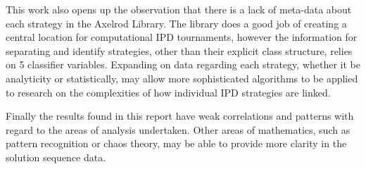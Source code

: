 This work also opens up the observation that there is a lack of meta-data about each strategy in the Axelrod Library.
The library does a good job of creating a central location for computational IPD tournaments, however the information for separating and identify strategies, other than their explicit class structure, relies on 5 classifier variables.
Expanding on data regarding each strategy, whether it be analyticity or statistically, may allow more sophisticated algorithms to be applied to research on the complexities of how individual IPD strategies are linked.

Finally the results found in this report have weak correlations and patterns with regard to the areas of analysis undertaken.
Other areas of mathematics, such as pattern recognition or chaos theory, may be able to provide more clarity in the solution sequence data. 